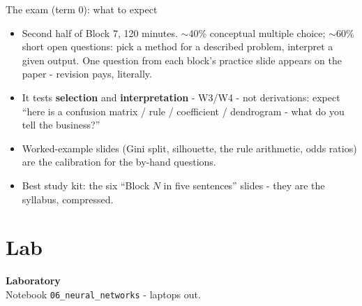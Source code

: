 \documentclass[10pt,aspectratio=169]{beamer}
\begin{document}
\begin{frame}{The exam (term 0): what to expect}
  \begin{itemize}
    \item Second half of Block 7, \alert{120 minutes}. \alert{$\sim$40\%}
          conceptual multiple choice; \alert{$\sim$60\%} short open
          questions: pick a method for a described problem, interpret a
          given output. One question from each block's practice slide
          appears on the paper - revision pays, literally.
    \item It tests \textbf{selection} and \textbf{interpretation} -
          W3/W4 - not derivations: expect ``here is a confusion matrix /
          rule / coefficient / dendrogram - what do you tell the
          business?''
    \item Worked-example slides (Gini split, silhouette, the rule
          arithmetic, odds ratios) are the calibration for the by-hand
          questions.
    \item Best study kit: the six \alert{``Block $N$ in five sentences''}
          slides - they are the syllabus, compressed.
  \end{itemize}
\end{frame}

\section{Lab}

\begin{frame}[plain]
  \begin{center}
    \vspace{1.5cm}
    {\LARGE\textbf{Laboratory}}\\[0.6cm]
    {\normalsize Notebook \texttt{06\_neural\_networks} - laptops out.}
  \end{center}
\end{frame}
\end{document}
